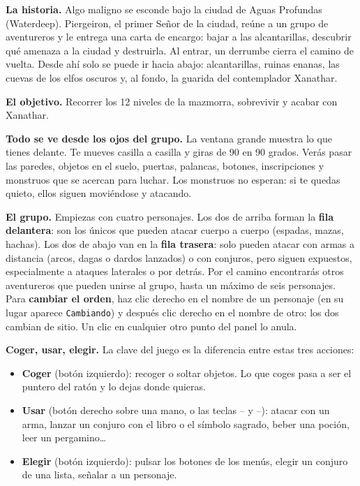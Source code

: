 

\textbf{La historia.} Algo maligno se esconde bajo la ciudad de Aguas Profundas (Waterdeep). Piergeiron, el primer Se\~nor de la ciudad, re\'une a un grupo de aventureros y le entrega una carta de encargo: bajar a las alcantarillas, descubrir qu\'e amenaza a la ciudad y destruirla. Al entrar, un derrumbe cierra el camino de vuelta. Desde ah\'i solo se puede ir hacia abajo: alcantarillas, ruinas enanas, las cuevas de los elfos oscuros y, al fondo, la guarida del contemplador Xanathar.

\textbf{El objetivo.} Recorrer los 12 niveles de la mazmorra, sobrevivir y acabar con Xanathar.

\textbf{Todo se ve desde los ojos del grupo.} La ventana grande muestra lo que tienes delante. Te mueves casilla a casilla y giras de 90 en 90 grados. Ver\'as pasar las paredes, objetos en el suelo, puertas, palancas, botones, inscripciones y monstruos que se acercan para luchar. Los monstruos no esperan: si te quedas quieto, ellos siguen movi\'endose y atacando.

\textbf{El grupo.} Empiezas con cuatro personajes. Los dos de arriba forman la \textbf{fila delantera}: son los \'unicos que pueden atacar cuerpo a cuerpo (espadas, mazas, hachas). Los dos de abajo van en la \textbf{fila trasera}: solo pueden atacar con armas a distancia (arcos, dagas o dardos lanzados) o con conjuros, pero siguen expuestos, especialmente a ataques laterales o por detrás. Por el camino encontrar\'as otros aventureros que pueden unirse al grupo, hasta un m\'aximo de seis personajes. Para \textbf{cambiar el orden}, haz clic derecho en el nombre de un personaje (en su lugar aparece \texttt{Cambiando}) y despu\'es clic derecho en el nombre de otro: los dos cambian de sitio. Un clic en cualquier otro punto del panel lo anula.

\textbf{Coger, usar, elegir.} La clave del juego es la diferencia entre estas tres acciones:
\begin{itemize}
\item \textbf{Coger} (bot\'on izquierdo): recoger o soltar objetos. Lo que coges pasa a ser el puntero del rat\'on y lo dejas donde quieras.
\item \textbf{Usar} (bot\'on derecho sobre una mano, o las teclas -- y --): atacar con un arma, lanzar un conjuro con el libro o el s\'imbolo sagrado, beber una poci\'on, leer un pergamino\dots
\item \textbf{Elegir} (bot\'on izquierdo): pulsar los botones de los men\'us, elegir un conjuro de una lista, se\~nalar a un personaje.
\end{itemize}

